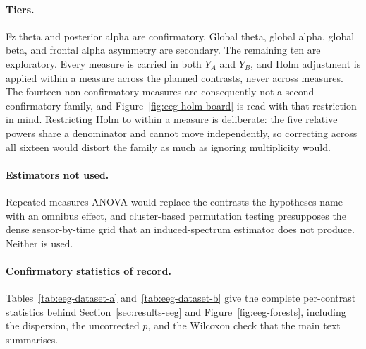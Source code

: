 \documentclass[english]{article}
\begin{document}
\paragraph{Tiers.}
Fz theta and posterior alpha are confirmatory. Global theta, global alpha, global beta, and frontal alpha asymmetry are secondary. The remaining ten are exploratory. Every measure is carried in both \(Y_A\) and \(Y_B\), and Holm adjustment is applied within a measure across the planned contrasts, never across measures. The fourteen non-confirmatory measures are consequently not a second confirmatory family, and Figure~\ref{fig:eeg-holm-board} is read with that restriction in mind. Restricting Holm to within a measure is deliberate: the five relative powers share a denominator and cannot move independently, so correcting across all sixteen would distort the family as much as ignoring multiplicity would.

\paragraph{Estimators not used.}
Repeated-measures ANOVA would replace the contrasts the hypotheses name with an omnibus effect, and cluster-based permutation testing presupposes the dense sensor-by-time grid that an induced-spectrum estimator does not produce. Neither is used.

\paragraph{Confirmatory statistics of record.}
Tables~\ref{tab:eeg-dataset-a} and~\ref{tab:eeg-dataset-b} give the complete per-contrast statistics behind Section~\ref{sec:results-eeg} and Figure~\ref{fig:eeg-forests}, including the dispersion, the uncorrected \(p\), and the Wilcoxon check that the main text summarises.
\end{document}
